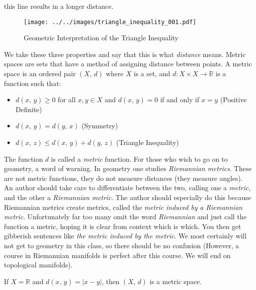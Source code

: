 \documentclass{article}
\theoremstyle{plain}
\theoremstyle{normal}
\newenvironment{example}{%
    \pushQED{\qed}\renewcommand{\qedsymbol}{$\blacksquare$}\examplex%
}{%
    \popQED\endexamplex%
}
\newenvironment{definition}{%
    \pushQED{\qed}\renewcommand{\qedsymbol}{$\blacksquare$}\definitionx%
}{%
    \popQED\enddefinitionx%
}
\begin{document}
        this line results in a longer distance.
        \begin{figure}
            \centering
            \texttt{[image: ../../images/triangle\_inequality\_001.pdf]}
            \caption{Geometric Interpretation of the Triangle Inequality}
            \label{fig:triangle_inequality_001}
        \end{figure}
        We take these three properties and say that this is what
        \textit{distance} means. Metric spaces are sets that have a method of
        assigning distance between points.
        \begin{definition}[\textbf{Metric Space}]
            A metric space is an ordered pair $(X,\,d)$ where $X$ is a set,
            and $d:X\times{X}\rightarrow\mathbb{R}$ is a function such that:
            \begin{itemize}
                \item $d(x,\,y)\geq{0}$ for all $x,y\in{X}$ and $d(x,\,y)=0$ if
                    and only if $x=y$ (Positive Definite)
                \item $d(x,\,y)=d(y,\,x)$ (Symmetry)
                \item $d(x,\,z)\leq{d}(x,\,y)+d(y,\,z)$ (Triangle Inequality) 
            \end{itemize}
            The function $d$ is called a \textit{metric} function.
        \end{definition}
        For those who wish to go on to geometry, a word of warning. In geometry
        one studies \textit{Riemannian metrics}. These are not metric functions,
        they do not measure distances (they measure angles). An author should
        take care to differentiate between the two, calling one a
        \textit{metric}, and the other a \textit{Riemannian metric}. The author
        should especially do this because Riemannian metrics create metrics,
        called the \textit{metric induced by a Riemannian metric}. Unfortunately
        far too many omit the word \textit{Riemannian} and just call the
        function a metric, hoping it is clear from context which is which.
        You then get gibberish sentences like
        \textit{the metric induced by the metric}. We most certainly will not
        get to geometry in this class, so there should be no confusion
        (However, a course in Riemannian manifolds is perfect after this course.
        We will end on topological manifolds).
        \begin{example}
            If $X=\mathbb{R}$ and $d(x,\,y)=|x-y|$, then $(X,\,d)$ is a metric
            space.
        \end{example}
\end{document}
